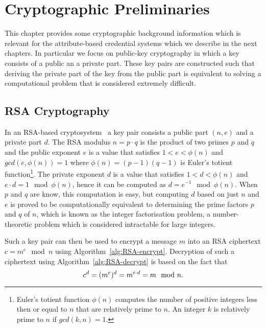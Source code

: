 \chapter{Cryptographic Preliminaries}

This chapter provides some cryptographic background information which is
relevant for the attribute-based credential systems which we describe in the
next chapters. In particular we focus on public-key cryptography in which a key
consists of a public an a private part. These key pairs are constructed such
that deriving the private part of the key from the public part is equivalent to
solving a computational problem that is considered extremely difficult.

\section{RSA Cryptography}

In an RSA-based cryptosystem~\cite{RSA1978} a key pair consists a public part
$(n, e)$ and a private part $d$. The RSA modulus $n = p \cdot q$ is the product
of two primes $p$ and $q$ and the public exponent $e$ is a value that satisfies
$1 < e < \phi(n)$ and $gcd(e, \phi(n)) = 1$ where $\phi(n) = (p-1)(q-1)$ is
Euler's totient function\footnote{Euler's totient function $\phi(n)$ computes
the number of positive integers less then or equal to $n$ that are relatively
prime to $n$. An integer $k$ is relatively prime to $n$ if $gcd(k, n) = 1$.}.
The private exponent $d$ is a value that satisfies $1 < d < \phi(n)$ and
$e \cdot d = 1 \mod \phi(n)$, hence it can be computed as
$d = e^{-1} \mod \phi(n)$. When $p$ and $q$ are know, this computation is easy,
but computing $d$ based on just $n$ and $e$ is proved to be computationally
equivalent to determining the prime factors $p$ and $q$ of $n$, which is known
as the integer factorisation problem, a number-theoretic problem which is
considered intractable for large integers.

Such a key pair can then be used to encrypt a message $m$ into an RSA ciphertext
$c = m^e \mod n$ using Algorithm~\ref{alg:RSA-encrypt}. Decryption of such a
ciphertext using Algorithm~\ref{alg:RSA-decrypt} is based on the fact that
\begin{equation*}
  c^d = (m^e)^d = m^{e \cdot d} = m \mod n\text.
\end{equation*}

